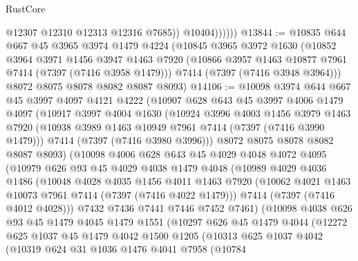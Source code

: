 \begin{lexlean}{RustCore}
\begin{coremodule}
                    @12307
                    @12310
                    @12313
                    @12316
                    @7685))
                @10404))))))
@13844 := @10835
    @644
    @667
    @45
    @3965
    @3974
    @1479
    @4224
    (@10845
      @3965
      @3972
      @1630
      (@10852
        @3964
        @3971
        @1456
        @3947
        @1463
        @7920
        (@10866 @3957 @1463 @10877 @7961 @7414 (@7397 (@7416 @3958 @1479)))
        @7414
        (@7397 (@7416 @3948 @3964)))
      @8072
      @8075
      @8078
      @8082
      @8087
      @8093)
@14106 := @10098
    @3974
    @644
    @667
    @45
    @3997
    @4097
    @4121
    @4222
    (@10907
      @628
      @643
      @45
      @3997
      @4006
      @1479
      @4097
      (@10917
        @3997
        @4004
        @1630
        (@10924
          @3996
          @4003
          @1456
          @3979
          @1463
          @7920
          (@10938 @3989 @1463 @10949 @7961 @7414 (@7397 (@7416 @3990 @1479)))
          @7414
          (@7397 (@7416 @3980 @3996)))
        @8072
        @8075
        @8078
        @8082
        @8087
        @8093)
      (@10098
        @4006
        @628
        @643
        @45
        @4029
        @4048
        @4072
        @4095
        (@10979
          @626
          @93
          @45
          @4029
          @4038
          @1479
          @4048
          (@10989
            @4029
            @4036
            @1486
            (@10048
              @4028
              @4035
              @1456
              @4011
              @1463
              @7920
              (@10062 @4021 @1463 @10073 @7961 @7414 (@7397 (@7416 @4022 @1479)))
              @7414
              (@7397 (@7416 @4012 @4028)))
            @7432
            @7436
            @7441
            @7446
            @7452
            @7461)
          (@10098
            @4038
            @626
            @93
            @45
            @1479
            @4045
            @1479
            @1551
            (@10297
              @626
              @45
              @1479
              @4044
              (@12272
                @625
                @1037
                @45
                @1479
                @4042
                @1500
                @1205
                (@10313
                  @625
                  @1037
                  @4042
                  (@10319
                    @624
                    @31
                    @1036
                    @1476
                    @4041
                    @7958
                    (@10784

\end{coremodule}
\end{lexlean}

